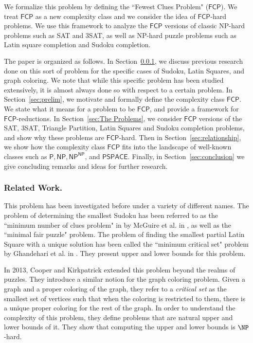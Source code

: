 \documentclass[runningheads,a4paper]{llncs}
\begin{document}
We formalize this problem by defining the ``Fewest Clues Problem" ($\mathsf{FCP}$). We treat $\mathsf{FCP}$ as a new complexity class and we consider the idea of $\mathsf{FCP}$-hard problems. We use this framework to analyze the $\mathsf{FCP}$ versions of classic NP-hard problems such as SAT and 3SAT, as well as NP-hard puzzle problems such as Latin square completion and Sudoku completion. 

The paper is organized as follows. In Section~\ref{sec:related}, we discuss previous research done on this sort of problem for the specific cases of Sudoku, Latin Squares, and graph coloring. We note that while this specific problem has been studied extensively, it is almost always done so with respect to a certain problem. In Section~\ref{sec:prelim}, we motivate and formally define the complexity class $\mathsf{FCP}$. We state what it means for a problem to be $\mathsf{FCP}$, and provide a framework for $\mathsf{FCP}$-reductions. In Section~\ref{sec:The Problems}, we consider $\mathsf{FCP}$ versions of the SAT, 3SAT, Triangle Partition, Latin Squares and Sudoku completion problems, and show why these problems are $\mathsf{FCP}$-hard. Then in Section~\ref{sec:relationship}, we show how the complexity class $\mathsf{FCP}$ fits into the landscape of well-known classes such as $\mathsf{P}, \mathsf{NP}, \mathsf{NP}^\mathsf{NP}$, and $\mathsf{PSPACE}$. Finally, in Section~\ref{sec:conclusion} we give concluding remarks and ideas for further research.


\subsubsection{Related Work.}
\label{sec:related}

This problem has been investigated before under a variety of different names. The problem of determining the smallest Sudoku has been referred to as the ``minimum number of clues problem" in
by McGuire et al. in \cite{mcguire2012there}, as well as the ``minimal fair puzzle" problem. The problem of finding the smallest partial Latin Square with a unique solution has been called the ``minimum critical set" problem by Ghandehari et al. in \cite{Ghandehari2005121}. They present upper and lower bounds for this problem. 

In 2013, Cooper and Kirkpatrick \cite{Cooper:2014:CSS:2612293.2612628} extended this problem beyond the realms of puzzles. They introduce a similar notion for the graph coloring problem. Given a graph and a proper coloring of the graph, they refer to a \emph{critical set} as the smallest set of vertices such that when the coloring is restricted to them, there is a unique proper coloring for the rest of the graph. In order to understand the complexity of this problem, they define problems that are natural upper and lower bounds of it. They show that computing the upper and lower bounds is $\NP$-hard. 
\end{document}
